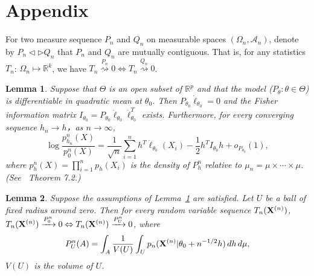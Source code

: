 \documentclass[3p]{elsarticle}
\theoremstyle{plain}
\newtheorem{lemma}{\quad\quad Lemma}
\theoremstyle{definition}
\theoremstyle{remark}
\begin{document}





\section{Appendix}
For two measure sequence $P_n$ and $Q_n$ on measurable spaces $(\Omega_n,\mathcal{A}_n)$, denote by $P_n\triangleleft \triangleright Q_n$ that $P_n$ and $Q_n$ are mutually contiguous. That is, for any statistics $T_n$: $\Omega_n\mapsto \mathbb{R}^k$, we have $T_n\overset{P_n}{\rightsquigarrow}0\Leftrightarrow T_n\overset{Q_n}{\rightsquigarrow}0$.
\begin{lemma}\label{lemmaEx}
    Suppose that $\Theta$ is an open subset of $\mathbb{R}^p$ and that the model ($P_\theta: \theta \in\Theta$) is differentiable in quadratic mean at $\theta_0$. Then $P_{\theta_0}\dot{\ell}_{\theta_0}=0$ and the Fisher information matrix $I_{\theta_0}=P_{\theta_0}\dot{\ell}_{\theta_0}\dot{\ell}_{\theta_0}^T$ exists. Furthermore, for every converging sequence $h_n\to h$，as $n\to \infty$,
    \begin{equation}
        \log \frac{p^n_{h_n}(X)}{p^n_0(X)}=\frac{1}{\sqrt{n}}\sum^n_{i=1}h^T\dot{\ell}_{\theta_0}(X_i)-\frac{1}{2}h^T I_{\theta_0}h+o_{P_{\theta_0}}(1),
    \end{equation}
    where $p_h^n(X)=\prod_{i=1}^n p_h(X_i)$ is the density of $P_h^n$ relative to $\mu_n=\mu\times \cdots \times \mu$.
    (See~\cite{van2000asymptotic} Theorem 7.2.)
\end{lemma}



\begin{lemma}\label{lemmaContiguity}
    Suppose the assumptions of Lemma~\ref{lemmaEx} are satisfied. Let $U$ be a ball of fixed radius around zero. 
    Then for every random variable sequence $T_n(\mathbf{X}^{(n)})$, $T_n(\mathbf{X}^{(n)})\xrightarrow{P^n_0}0\Leftrightarrow T_n (\mathbf{X}^{(n)})\xrightarrow{P^n_U}0$, where
\begin{equation*}
    P^n_U(A)=\int_{A}\frac{1}{V(U)}\int_{U}p_n(\mathbf{X}^{(n)}|\theta_0+n^{-1/2}h)\, dh \, d\mu,
\end{equation*}
$V(U)$ is the volume of $U$.
\end{lemma}
\end{document}
